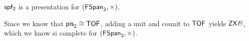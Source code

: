 \begin{lemma}
\label{lem:spanand}
${\sf sp}\mathsf{f}_2$ is a presentation for  $(\mathsf{FSpan}_2,\times)$.
\end{lemma}

Since we know that ${\sf pis}_2\cong \mathsf{TOF}$, adding a unit and counit to $\mathsf{TOF}$ yields $\mathsf{ZX}\textit{\&}$, which we know si complete for $(\mathsf{FSpan}_2,\times)$.



%
%
%
%
%
%
%
%
%
%


%
%






%
%
%
%
%
%



